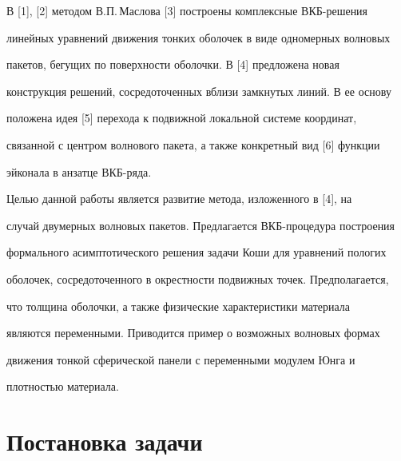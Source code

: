   


\pagestyle{plain} %


  


  




  


\maketitle  


 


В [1], [2] методом В.П.\,Маслова [3] построены комплексные ВКБ-решения 


линейных уравнений движения тонких оболочек в виде одномерных волновых 


пакетов, бегущих по поверхности оболочки. В [4] предложена новая 


конструкция решений, сосредоточенных вблизи замкнутых линий. В ее основу 


положена идея [5] перехода к подвижной локальной системе координат, 


связанной с центром волнового пакета, а также конкретный вид [6] функции 


эйконала в анзатце ВКБ-ряда. 


 


Целью данной работы является развитие метода, изложенного в [4], на 


случай двумерных волновых пакетов. Предлагается ВКБ-процедура построения 


формального асимптотического решения задачи Коши для уравнений пологих 


оболочек, сосредоточенного в окрестности подвижных точек. Предполагается, 


что толщина оболочки, а также физические характеристики материала 


являются переменными. Приводится пример о возможных волновых формах 


движения тонкой сферической панели с переменными модулем Юнга и 


плотностью материала. 


 


\section{Постановка задачи} 


